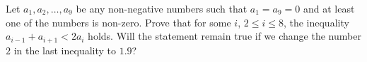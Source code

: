 Let $a_1,a_2,\ldots ,a_9$ be any non-negative numbers such that $a_1=a_9=0$ and at least one of the numbers is non-zero. Prove that for some $i$,  $2\le i\le 8$,  the inequality $a_{i-1}+a_{i+1}<2a_i$ holds. Will the statement remain true if we change the number $2$ in the last inequality to $1.9$?